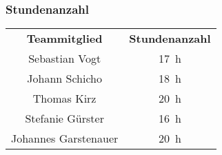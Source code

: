 \begin{landscape}
    \subsubsection{Stundenanzahl}
    \begin{center}
        \begin{tabular}{ c c }
            \textbf{Teammitglied} & \textbf{Stundenanzahl} \\
            Sebastian Vogt        & 17~h                   \\
            Johann Schicho        & 18~h                   \\
            Thomas Kirz           & 20~h                   \\
            Stefanie Gürster      & 16~h                   \\
            Johannes Garstenauer  & 20~h
        \end{tabular}
    \end{center}


\end{landscape}
